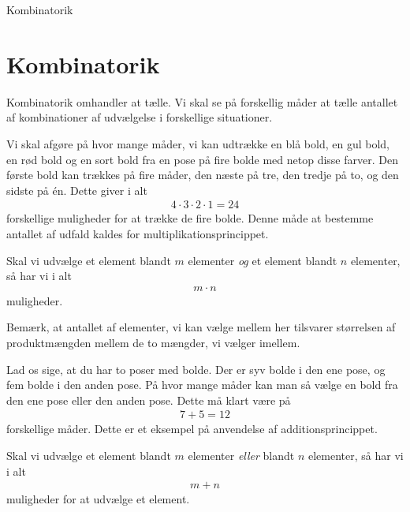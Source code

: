 \begin{center}
\Huge
Kombinatorik
\end{center}

\section*{Kombinatorik}
Kombinatorik omhandler at tælle. Vi skal se på forskellig måder at tælle antallet af kombinationer af udvælgelse i forskellige situationer.

\begin{exa}
Vi skal afgøre på hvor mange måder, vi kan udtrække en blå bold, en gul bold, en rød bold og en sort bold fra en pose på fire bolde med netop disse farver. Den første bold kan trækkes på fire måder, den næste på tre, den tredje på to, og den sidste på én. Dette giver i alt
\begin{align*}
4\cdot 3\cdot 2\cdot 1 = 24
\end{align*}
forskellige muligheder for at trække de fire bolde. Denne måde at bestemme antallet af udfald kaldes for multiplikationsprincippet.
\end{exa}

\begin{setn}[Multiplikationsprincippet]
Skal vi udvælge et element blandt $m$ elementer \textit{og} et element blandt $n$ elementer, så har vi i alt
\begin{align*}
m\cdot n
\end{align*}
muligheder.
\end{setn}
Bemærk, at antallet af elementer, vi kan vælge mellem her tilsvarer størrelsen af produktmængden mellem de to mængder, vi vælger imellem.


\begin{exa}
Lad os sige, at du har to poser med bolde. Der er syv bolde i den ene pose, og fem bolde i den anden pose. På hvor mange måder kan man så vælge en bold fra den ene pose eller den anden pose. Dette må klart være på
\begin{align*}
7+5 = 12
\end{align*}
forskellige måder. Dette er et eksempel på anvendelse af additionsprincippet. 
\end{exa}
\begin{setn}[Additionsprincippet]
Skal vi udvælge et element blandt $m$ elementer \textit{eller} blandt $n$ elementer, så har vi i alt 
\begin{align*}
m+n
\end{align*}
muligheder for at udvælge et element. 
\end{setn}

